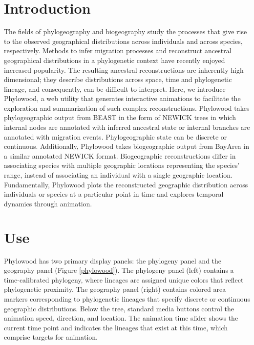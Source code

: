 \documentclass[11pt]{article}
\begin{document}
\section{Introduction}

The fields of phylogeography and biogeography study the processes that give rise to the observed geographical distributions across individuals and across species, respectively. Methods to infer migration processes and reconstruct ancestral geographical distributions in a phylogenetic context have recently enjoyed increased popularity. The resulting ancestral reconstructions are inherently high dimensional; they describe distributions across space, time and phylogenetic lineage, and consequently, can be difficult to interpret. Here, we introduce Phylowood, a web utility that generates interactive animations to facilitate the exploration and summarization of such complex reconstructions.
Phylowood takes phylogeographic output from BEAST \citep{drummond12} in the form of NEWICK trees in which internal nodes are annotated with inferred ancestral state or internal branches are annotated with migration events. Phylogeographic state can be discrete or continuous. Additionally, Phylowood takes biogeographic output from BayArea \citep{landis12} in a similar annotated NEWICK format.  Biogeographic reconstructions differ in associating species with multiple geographic locations representing the species' range, instead of associating an individual with a single geographic location. Fundamentally, Phylowood plots the reconstructed geographic distribution across individuals or species at a particular point in time and explores temporal dynamics through animation.

\section{Use}

Phylowood has two primary display panels: the phylogeny panel and the geography panel (Figure \ref{phylowood}). The phylogeny panel (left) contains a time-calibrated phylogeny, where lineages are assigned unique colors that reflect phylogenetic proximity. The geography panel (right) contains colored area markers corresponding to phylogenetic lineages that specify discrete or continuous geographic distributions. Below the tree, standard media buttons control the animation speed, direction, and location. The animation time slider shows the current time point and indicates the lineages that exist at this time, which comprise targets for animation.
\end{document}
